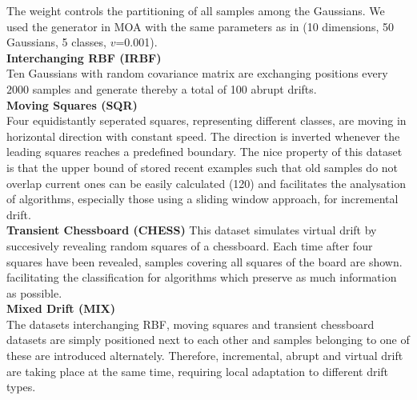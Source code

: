 \documentclass[conference]{IEEEtran}
\begin{document}
The weight controls the partitioning of all samples among the Gaussians.
We used the generator in MOA with the same parameters as in \cite{Bifet:2013:EDS:2480362.2480516} (10 dimensions, 50 Gaussians, 5 classes, $v$=0.001).\\ 
\textbf{Interchanging RBF (IRBF)}\\
Ten Gaussians with random covariance matrix are exchanging positions every $2000$ samples and generate thereby a total of 100 abrupt drifts.\\ 
\textbf{Moving Squares (SQR)}\\
Four equidistantly seperated squares, representing different classes, are moving in horizontal direction with constant speed. The direction is inverted whenever the leading squares reaches a predefined boundary.
The nice property of this dataset is that the upper bound of stored recent examples such that old samples do not overlap current ones can be easily calculated (120) and  
facilitates the analysation of algorithms, especially those using a sliding window approach, for incremental drift.\\
\textbf{Transient Chessboard (CHESS)}
This dataset simulates virtual drift by succesively revealing random squares of a chessboard. Each time after four squares have been revealed, samples covering all squares of the board are shown.
facilitating the classification for algorithms which preserve as much information as possible.\\ 
\textbf{Mixed Drift (MIX)} \\
The datasets interchanging RBF, moving squares and transient chessboard datasets are simply positioned next to each other and samples belonging to one of these are introduced alternately.
Therefore, incremental, abrupt and virtual drift are taking place at the same time, requiring local adaptation to different drift types.\\
\end{document}
